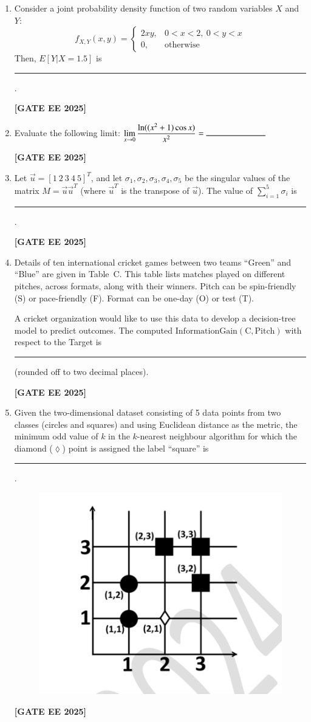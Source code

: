 \documentclass[journal]{IEEEtran}
\newcommand{\qfooter}{%
  \begin{flushright}\footnotesize\textbf{[GATE EE 2025]}\end{flushright}\vspace{1em}%
}
\begin{document}
\begin{enumerate}[leftmargin=*,label=\arabic*.]
\item Consider a joint probability density function of two random variables $X$ and $Y$:
\[
f_{X,Y}(x, y) = \begin{cases}
2xy,& 0 < x < 2,\ 0 < y < x\\
0,& \text{otherwise}
\end{cases}
\]
Then, $E[Y|X=1.5]$ is \rule{7em}{0.07em}.
\qfooter

\item Evaluate the following limit:
$\displaystyle \lim_{x\to 0} \frac{\ln((x^2+1)\cos x)}{x^2} = \rule{7em}{0.07em}$
\qfooter



\item Let $\vec{u} = [1\ 2\ 3\ 4\ 5]^T$, and let $\sigma_1, \sigma_2, \sigma_3, \sigma_4, \sigma_5$ be the singular values of the matrix $M = \vec{u} \vec{u}^T$ (where $\vec{u}^T$ is the transpose of $\vec{u}$). The value of $\sum\limits_{i=1}^{5} \sigma_i$ is \rule{7em}{0.07em}.
\qfooter

\item Details of ten international cricket games between two teams “Green” and “Blue” are given in Table~C. 
This table lists matches played on different pitches, across formats, along with their winners.  
Pitch can be spin-friendly (S) or pace-friendly (F).  
Format can be one-day (O) or test (T).

A cricket organization would like to use this data to develop a decision-tree model to predict outcomes.  
The computed $\mathrm{InformationGain}(\mathrm{C}, \mathrm{Pitch})$ with respect to the Target is \rule{2cm}{0.15mm} (rounded off to two decimal places).

\qfooter

\item Given the two-dimensional dataset consisting of 5 data points from two classes (circles and squares)  
and using Euclidean distance as the metric, the minimum odd value of $k$ in the $k$-nearest neighbour algorithm  
for which the diamond ($\lozenge$) point is assigned the label ``square'' is \rule{2cm}{0.15mm}.

\begin{figure}[H]
\centering
\includegraphics[width=0.45\columnwidth]{figs/63.png} %
\end{figure}
\qfooter



\end{enumerate}
\end{document}
